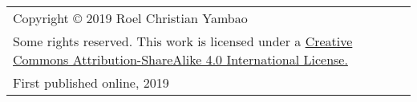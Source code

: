 \thispagestyle{empty}

    \vspace*{\fill}
\begin{flushleft}

\begin{tabularx}{\textwidth}{Y}
Copyright © 2019 Roel Christian Yambao\\
\addlinespace
Some rights reserved. This work is licensed under a \href{https://creativecommons.org/licenses/by-sa/4.0/}{Creative Commons Attribution-ShareAlike 4.0 International License.}\\
\addlinespace
First published online, 2019

\end{tabularx}

\end{flushleft}
